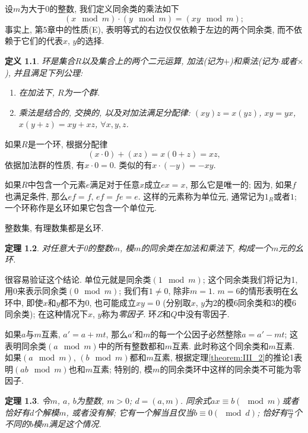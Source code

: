 \documentclass[12pt,a4paper]{book} %
\makeatletter
\newcommand{\Rmnum}[1]{\expandafter\@slowromancap\romannumeral #1@}
\newtheorem{theorem}{定理}
\newtheorem{definition}[theorem]{定义}
\theoremstyle{remark}
\theoremstyle{example}
\theoremstyle{lemma}
\theoremstyle{corollary}
\numberwithin{theorem}{chapter}
\makeatother
\begin{document}
\chapter{} \label{chapter:6}
设$m$为大于0的整数, 我们定义同余类的乘法如下
\[
(x \mod m) \cdot (y \mod m) = (xy \mod m);
\]
事实上, 第5章中的性质(E), 表明等式的右边仅仅依赖于左边的两个同余类, 而不依赖于它们的代表$x$, $y$的选择.

\begin{definition}
\emph{环}是集合$R$以及集合上的两个二元运算, 加法(记为$+$)和乘法(记为$\cdot$或者$\times$), 并且满足下列公理:
\begin{enumerate}
\item[\Rmnum{1}] 在加法下, $R$为一个群.

\item[\Rmnum{2}] 乘法是结合的, 交换的, 以及对加法满足分配律: $(xy)z = x(yz)$, $xy = yx$, $x(y + z) = xy + xz$, $\forall x, y, z$.

\end{enumerate}
\end{definition}

如果$R$是一个环, 根据分配律
\[
(x \cdot 0) + (xz) = x(0 + z) = xz,
\]
依据加法群的性质, 有$x \cdot 0 = 0$. 类似的有$x \cdot (-y) = -xy$.

如果$R$中包含一个元素$e$满足对于任意$x$成立$ex = x$, 那么它是唯一的; 因为, 如果$f$也满足条件, 那么$ef = f$, $ef = fe = e$. 这样的元素称为单位元, 通常记为$1_R$或者$1$; 一个环称作是幺环如果它包含一个单位元.

整数集, 有理数集都是幺环.

\begin{theorem}  \label{theorem:VI_1}
对任意大于0的整数$m$, 模$m$的同余类在加法和乘法下, 构成一个$m$元的幺环.
\end{theorem}

很容易验证这个结论. 单位元就是同余类$(1 \mod m)$; 这个同余类我们将记为1, 用0来表示同余类$(0 \mod m)$; 我们有$1 \neq 0$, 除非$m = 1$. $m = 6$的情形表明在幺环中, 即使$x$和$y$都不为0, 也可能成立$xy = 0$ (分别取$x$, $y$为2的模6同余类和3的模6同余类); 在这种情况下$x$, $y$称为\emph{零因子}. 环$Z$和$Q$中没有零因子.

如果$a$与$m$互素, $a' = a + mt$, 那么$a'$和$m$的每一个公因子必然整除$a = a' - mt$; 这表明同余类$(a \mod m)$中的所有整数都和$m$互素. 此时称这个同余类和$m$互素. 如果$(a \mod m)$, $(b \mod m)$都和$m$互素, 根据定理\ref{theorem:III_2}的推论1表明$(ab \mod m)$也和$m$互素; 特别的, 模$m$的同余类环中这样的同余类不可能为零因子.

\begin{theorem}  \label{theorem:VI_2}
令$m$, $a$, $b$为整数, $m > 0$; $d = (a, m)$. 同余式$ax \equiv b (\mod m)$或者恰好有$d$个解模$m$, 或者没有解; 它有一个解当且仅当$b \equiv 0 (\mod d)$; 恰好有$\frac{m}{d}$个不同的$b$模$m$满足这个情况.
\end{theorem}
\end{document}

